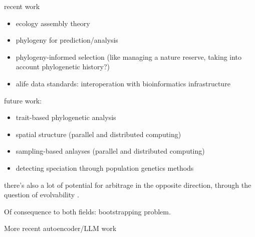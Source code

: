 recent work
\begin{itemize}
  \item ecology assembly theory \citep{dolson2024reachability}
  \item phylogeny for prediction/analysis \citep{hernandez2022can,shahbandegan2022untangling}
  \item phylogeny-informed selection (like managing a nature reserve, taking into account phylogenetic history?)
  \item alife data standards: interoperation with bioinformatics infrastructure \citep{lalejini2019data,moreno2024apc}
\end{itemize}

future work:
\begin{itemize}
  \item trait-based phylogenetic analysis
  \item spatial structure (parallel and distributed computing)
  \item sampling-based anlayses (parallel and distributed computing)
  \item detecting speciation through population genetics methods \citep{sukumaran2021incorporating}
\end{itemize}

there's also a lot of potential for arbitrage in the opposite direction, through the question of evolvability \citep{kirschner1998evolvability}.
\citep{moreno2018understanding}

Of consequence to both fields: bootstrapping problem.

More recent autoencoder/LLM work \citep{bradley2024openelm,wittenberg2023denoising}
